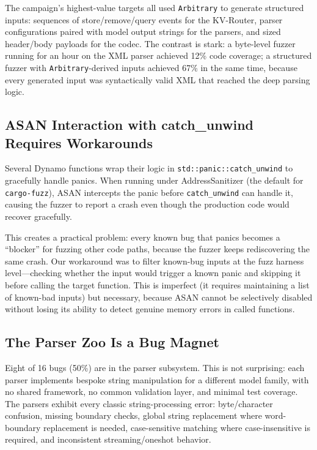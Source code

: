 The campaign's highest-value targets all used \texttt{Arbitrary} to generate structured inputs: sequences of store/remove/query events for the KV-Router, parser configurations paired with model output strings for the parsers, and sized header/body payloads for the codec. The contrast is stark: a byte-level fuzzer running for an hour on the XML parser achieved 12\% code coverage; a structured fuzzer with \texttt{Arbitrary}-derived inputs achieved 67\% in the same time, because every generated input was syntactically valid XML that reached the deep parsing logic.

\subsection{ASAN Interaction with catch\_unwind Requires Workarounds}

%
Several Dynamo functions wrap their logic in \texttt{std::panic::catch\_unwind} to gracefully handle panics. When running under AddressSanitizer (the default for \texttt{cargo-fuzz}), ASAN intercepts the panic before \texttt{catch\_unwind} can handle it, causing the fuzzer to report a crash even though the production code would recover gracefully.

This creates a practical problem: every known bug that panics becomes a ``blocker'' for fuzzing other code paths, because the fuzzer keeps rediscovering the same crash. Our workaround was to filter known-bug inputs at the fuzz harness level---checking whether the input would trigger a known panic and skipping it before calling the target function. This is imperfect (it requires maintaining a list of known-bad inputs) but necessary, because ASAN cannot be selectively disabled without losing its ability to detect genuine memory errors in called functions.

\subsection{The Parser Zoo Is a Bug Magnet}

Eight of 16 bugs (50\%) are in the parser subsystem. This is not surprising: each parser implements bespoke string manipulation for a different model family, with no shared framework, no common validation layer, and minimal test coverage. The parsers exhibit every classic string-processing error: byte/character confusion, missing boundary checks, global string replacement where word-boundary replacement is needed, case-sensitive matching where case-insensitive is required, and inconsistent streaming/oneshot behavior.

